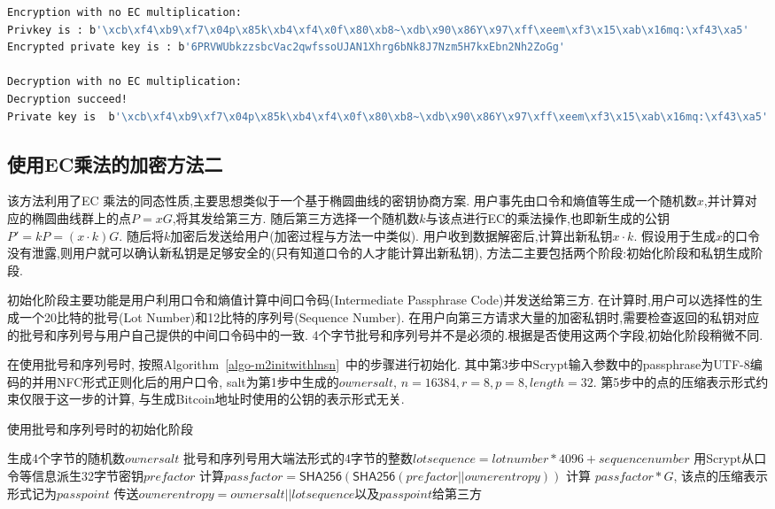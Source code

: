 \begin{lstlisting}[language=bash, caption = Listing~\ref{lst-m1}~的执行结果示例, label=lst-m1res]
Encryption with no EC multiplication:
Privkey is : b'\xcb\xf4\xb9\xf7\x04p\x85k\xb4\xf4\x0f\x80\xb8~\xdb\x90\x86Y\x97\xff\xeem\xf3\x15\xab\x16mq:\xf43\xa5'
Encrypted private key is : b'6PRVWUbkzzsbcVac2qwfssoUJAN1Xhrg6bNk8J7Nzm5H7kxEbn2Nh2ZoGg'

Decryption with no EC multiplication:
Decryption succeed!
Private key is  b'\xcb\xf4\xb9\xf7\x04p\x85k\xb4\xf4\x0f\x80\xb8~\xdb\x90\x86Y\x97\xff\xeem\xf3\x15\xab\x16mq:\xf43\xa5'
\end{lstlisting}


\subsection{使用EC乘法的加密方法二}

该方法利用了EC 乘法的同态性质,主要思想类似于一个基于椭圆曲线的密钥协商方案.
用户事先由口令和熵值等生成一个随机数$x$,并计算对应的椭圆曲线群上的点$P=xG$,将其发给第三方.
随后第三方选择一个随机数$k$与该点进行EC的乘法操作,也即新生成的公钥$P'=kP=(x \cdot k)G$.
随后将$k$加密后发送给用户(加密过程与方法一中类似).
用户收到数据解密后,计算出新私钥$x\cdot k$.
假设用于生成$x$的口令没有泄露,则用户就可以确认新私钥是足够安全的(只有知道口令的人才能计算出新私钥), 
方法二主要包括两个阶段:初始化阶段和私钥生成阶段.

初始化阶段主要功能是用户利用口令和熵值计算中间口令码(Intermediate Passphrase Code)并发送给第三方.  
在计算时,用户可以选择性的生成一个20比特的批号(Lot Number)和12比特的序列号(Sequence Number).
在用户向第三方请求大量的加密私钥时,需要检查返回的私钥对应的批号和序列号与用户自己提供的中间口令码中的一致.
4个字节批号和序列号并不是必须的.根据是否使用这两个字段,初始化阶段稍微不同. 
 
 
 在使用批号和序列号时, 按照Algorithm~\ref{algo-m2initwithlnsn}~中的步骤进行初始化. 
 其中第3步中Scrypt输入参数中的passphrase为UTF-8编码的并用NFC形式正则化后的用户口令,
 salt为第1步中生成的$ownersalt$,  $n=16384, r=8, p=8, length=32$.
 第5步中的点的压缩表示形式约束仅限于这一步的计算, 与生成Bitcoin地址时使用的公钥的表示形式无关.
 
\begin{algorithm}[h]\footnotesize
\caption{使用批号和序列号时的初始化阶段}\label{algo-m2initwithlnsn}
  	\begin{algorithmic}[1]
	   	 \STATE 生成4个字节的随机数$ownersalt$
		\STATE 批号和序列号用大端法形式的4字节的整数$lotsequence=lotnumber * 4096 + sequencenumber$
		\STATE  用Scrypt从口令等信息派生32字节密钥$prefactor$
		\STATE 计算$passfactor = \textsf{SHA256}(\textsf{SHA256}(prefactor || ownerentropy))$
		\STATE 计算 $passfactor * G$, 该点的压缩表示形式记为$passpoint$
		\STATE 传送$ownerentropy = ownersalt || lotsequence$以及$passpoint$给第三方
    \end{algorithmic}
\end{algorithm}

